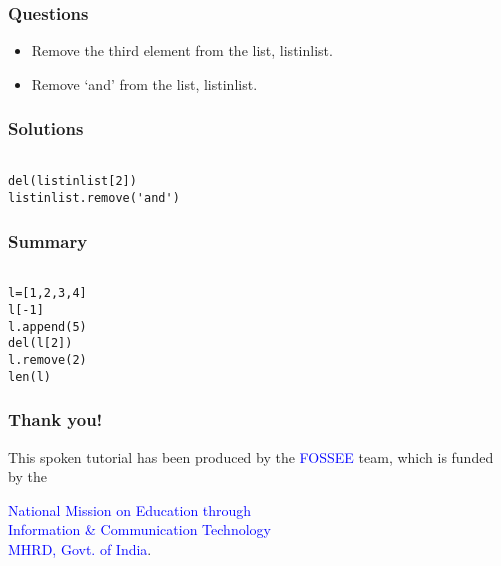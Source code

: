 \documentclass[presentation]{beamer}
\begin{document}
\begin{frame}
\frametitle{Questions}
\label{sec-6}


\begin{itemize}
\item Remove the third element from the list, listinlist.
\item Remove `and' from the list, listinlist.
\end{itemize}
\end{frame}
\begin{frame}[fragile]
\frametitle{Solutions}
\label{sec-7}

\begin{verbatim}

del(listinlist[2])
listinlist.remove('and')
\end{verbatim}
\end{frame}
\begin{frame}[fragile]
\frametitle{Summary}
\label{sec-8}

\begin{verbatim}

l=[1,2,3,4]
l[-1]
l.append(5)
del(l[2])
l.remove(2)
len(l)
\end{verbatim}
\end{frame}
\begin{frame}
\frametitle{Thank you!}
\label{sec-9}

  \begin{block}{}
  \begin{center}
  This spoken tutorial has been produced by the
  \textcolor{blue}{FOSSEE} team, which is funded by the 
  \end{center}
  \begin{center}
    \textcolor{blue}{National Mission on Education through \\
      Information \& Communication Technology \\ 
      MHRD, Govt. of India}.
  \end{center}  
  \end{block}
\end{frame}
\end{document}
